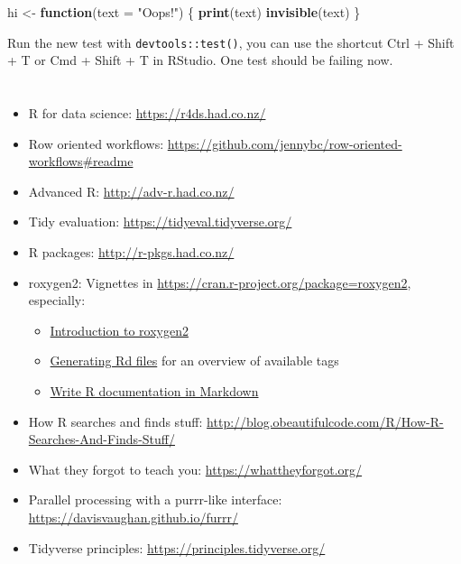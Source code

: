 \documentclass[]{book}
\newenvironment{Shaded}{\begin{snugshade}}{\end{snugshade}}
\newcommand{\ControlFlowTok}[1]{\textcolor[rgb]{0.13,0.29,0.53}{\textbf{#1}}}
\newcommand{\DataTypeTok}[1]{\textcolor[rgb]{0.13,0.29,0.53}{#1}}
\newcommand{\KeywordTok}[1]{\textcolor[rgb]{0.13,0.29,0.53}{\textbf{#1}}}
\newcommand{\NormalTok}[1]{#1}
\newcommand{\StringTok}[1]{\textcolor[rgb]{0.31,0.60,0.02}{#1}}
\begin{document}
\begin{Shaded}
\begin{Highlighting}[]
\NormalTok{hi <-}\StringTok{ }\ControlFlowTok{function}\NormalTok{(}\DataTypeTok{text =} \StringTok{"Oops!"}\NormalTok{) \{}
  \KeywordTok{print}\NormalTok{(text)}
  \KeywordTok{invisible}\NormalTok{(text)}
\NormalTok{\}}
\end{Highlighting}
\end{Shaded}

Run the new test with \texttt{devtools::test()}, you can use the shortcut Ctrl + Shift + T or Cmd + Shift + T in RStudio.
One test should be failing now.

\hypertarget{section}{%
\chapter{}\label{section}}

\begin{itemize}
\item
  R for data science: \url{https://r4ds.had.co.nz/}
\item
  Row oriented workflows: \url{https://github.com/jennybc/row-oriented-workflows\#readme}
\item
  Advanced R: \url{http://adv-r.had.co.nz/}
\item
  Tidy evaluation: \url{https://tidyeval.tidyverse.org/}
\item
  R packages: \url{http://r-pkgs.had.co.nz/}
\item
  roxygen2: Vignettes in \url{https://cran.r-project.org/package=roxygen2}, especially:

  \begin{itemize}
  \item
    \href{https://cran.r-project.org/web/packages/roxygen2/vignettes/roxygen2.html}{Introduction to roxygen2}
  \item
    \href{https://cran.r-project.org/web/packages/roxygen2/vignettes/rd.html}{Generating Rd files} for an overview of available tags
  \item
    \href{https://cran.r-project.org/web/packages/roxygen2/vignettes/markdown.html}{Write R documentation in Markdown}
  \end{itemize}
\item
  How R searches and finds stuff: \url{http://blog.obeautifulcode.com/R/How-R-Searches-And-Finds-Stuff/}
\item
  What they forgot to teach you: \url{https://whattheyforgot.org/}
\item
  Parallel processing with a purrr-like interface: \url{https://davisvaughan.github.io/furrr/}
\item
  Tidyverse principles: \url{https://principles.tidyverse.org/}
\end{itemize}
\end{document}
